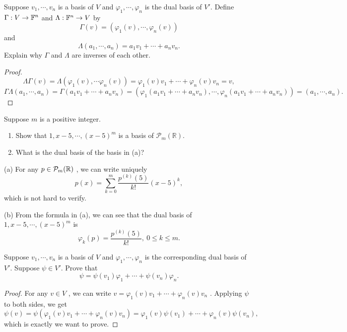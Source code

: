 \documentclass{article}
\begin{document}
\begin{problem}[3F-8]
	Suppose $v_1, \cdots, v_n$ is a basis of $V$ and $\varphi_1, \cdots, \varphi_n$
	is the dual basis of $V'$. Define $\Gamma : V \to \mathbb{F}^n$ and
	$\Lambda : \mathbb{F}^n \to V$ by
	\[
		\Gamma(v) = (\varphi_1(v), \cdots, \varphi_n(v))
	\]
	and
	\[
		\Lambda(a_1, \cdots, a_n) = a_1v_1 + \cdots + a_nv_n.
	\]
	Explain why $\Gamma$ and $\Lambda$ are inverses of each other.
\end{problem}

\begin{proof}
	\[ \Lambda\Gamma(v)=\Lambda(\varphi_1(v),\cdots\varphi_n(v))=\varphi_1(v)v_1+\cdots+\varphi_n(v)v_n=v, \]
	\[ \Gamma\Lambda(a_1,\cdots,a_n)=\Gamma(a_1v_1+\cdots+a_nv_n)=(\varphi_1(a_1v_1+\cdots+a_nv_n),\cdots,\varphi_n(a_1v_1+\cdots+a_nv_n))=(a_1,\cdots,a_n). \]
\end{proof}

\begin{problem}[3F-10]
	Suppose $m$ is a positive integer.
	\begin{enumerate}[label=(\alph*)]
		\item Show that $1, x - 5, \cdots, (x - 5)^m$ is a basis of
		      $\mathcal{P}_m(\mathbb{R})$.
		\item What is the dual basis of the basis in (a)?
	\end{enumerate}
\end{problem}

\begin{solution}
	(a) For any \( p\in \mathcal{P}_m(\mathbb{R}) \) , we can write uniquely
	\[ p(x)=\sum_{k=0}^{m} \frac{p^{(k)}(5)}{k!} (x-5)^k, \] 
	which is not hard to verify.\par
	(b) From the formula in (a), we can see that the dual basis of \( 1, x - 5, \cdots, (x - 5)^m \) is
	\[ \varphi_k(p)=\frac{p^{(k)}(5)}{k!},\ 0\le k\le m. \] 
\end{solution}

\begin{problem}[3F-11]
	Suppose $v_1, \cdots, v_n$ is a basis of $V$ and $\varphi_1, \cdots, \varphi_n$
	is the corresponding dual basis of $V'$. Suppose $\psi \in V'$. Prove that
	\[
		\psi = \psi(v_1)\varphi_1 + \cdots + \psi(v_n)\varphi_n.
	\]
\end{problem}

\begin{proof}
	For any \( v\in V \) , we can write \( v=\varphi_1(v)v_1+\cdots+\varphi_n(v)v_n \) . Applying \( \psi \) to both sides, we get
	\[ \psi(v) = \psi(\varphi_1(v)v_1+\cdots+\varphi_n(v)v_n) = \varphi_1(v)\psi(v_1)+\cdots+\varphi_n(v)\psi(v_n), \] 
	which is exactly we want to prove.
\end{proof}
\end{document}
